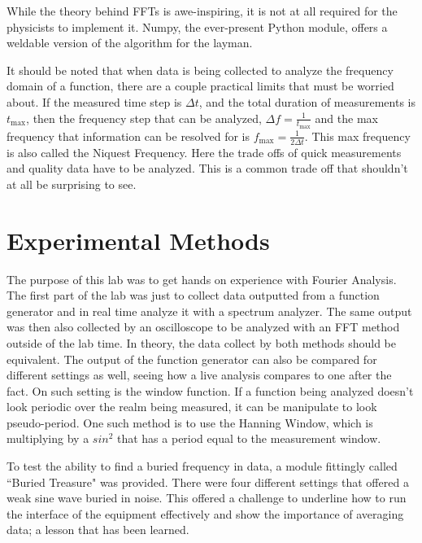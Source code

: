 \documentclass[12pt]{article}
\begin{document}
    While the theory behind FFTs is awe-inspiring, it is not at all required for the physicists to implement it. Numpy, the ever-present Python module, offers a weldable version of the algorithm for the layman.
    
    It should be noted that when data is being collected to analyze the frequency domain of a function, there are a couple practical limits that must be worried about. If the measured time step is $\Delta t$, and the total duration of measurements is $t_{\text{max}}$, then the frequency step that can be analyzed, $\Delta f = \frac{1}{t_{\text{max}}}$ and the max frequency that information can be resolved for is $f_{\text{max}} = \frac{1}{2 \Delta t}$. This max frequency is also called the Niquest Frequency. Here the trade offs of quick measurements and quality data have to be analyzed. This is a common trade off that shouldn't at all be surprising to see.
    
    \section{Experimental Methods}
    
    The purpose of this lab was to get hands on experience with Fourier Analysis. The first part of the lab was just to collect data outputted from a function generator and in real time analyze it with a spectrum analyzer. The same output was then also collected by an oscilloscope to be analyzed with an FFT method outside of the lab time. In theory, the data collect by both methods should be equivalent. The output of the function generator can also be compared for different settings as well, seeing how a live analysis compares to one after the fact. On such setting is the window function. If a function being analyzed doesn't look periodic over the realm being measured, it can be manipulate to look pseudo-period. One such method is to use the Hanning Window, which is multiplying by a $sin^2$ that has a period equal to the measurement window. 
    
    To test the ability to find a buried frequency in data, a module fittingly called ``Buried Treasure" was provided. There were four different settings that offered a weak sine wave buried in noise. This offered a challenge to underline how to run the interface of the equipment effectively and show the importance of averaging data; a lesson that has been learned.
    
\end{document}
